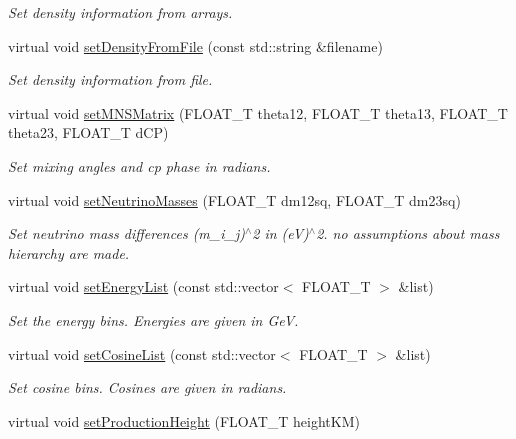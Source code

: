 \begin{DoxyCompactItemize}
\begin{DoxyCompactList}\small\item\em Set density information from arrays. \end{DoxyCompactList}\item 
virtual void \hyperlink{classcudaprob3_1_1Propagator_a7d40f7d7e0716e5b532a7a3a228d3b01}{set\+Density\+From\+File} (const std\+::string \&filename)
\begin{DoxyCompactList}\small\item\em Set density information from file. \end{DoxyCompactList}\item 
virtual void \hyperlink{classcudaprob3_1_1Propagator_ad866c252d72ae6cc0ed3fc3b76c7cac7}{set\+M\+N\+S\+Matrix} (F\+L\+O\+A\+T\+\_\+T theta12, F\+L\+O\+A\+T\+\_\+T theta13, F\+L\+O\+A\+T\+\_\+T theta23, F\+L\+O\+A\+T\+\_\+T d\+CP)
\begin{DoxyCompactList}\small\item\em Set mixing angles and cp phase in radians. \end{DoxyCompactList}\item 
virtual void \hyperlink{classcudaprob3_1_1Propagator_adaa3bc796f0bca8ce177f364c559b262}{set\+Neutrino\+Masses} (F\+L\+O\+A\+T\+\_\+T dm12sq, F\+L\+O\+A\+T\+\_\+T dm23sq)
\begin{DoxyCompactList}\small\item\em Set neutrino mass differences (m\+\_\+i\+\_\+j)$^\wedge$2 in (eV)$^\wedge$2. no assumptions about mass hierarchy are made. \end{DoxyCompactList}\item 
virtual void \hyperlink{classcudaprob3_1_1Propagator_a1135d977c5034e982a63c583ab4dad06}{set\+Energy\+List} (const std\+::vector$<$ F\+L\+O\+A\+T\+\_\+T $>$ \&list)
\begin{DoxyCompactList}\small\item\em Set the energy bins. Energies are given in GeV. \end{DoxyCompactList}\item 
virtual void \hyperlink{classcudaprob3_1_1Propagator_ac2beb7d48c566ef0f07666927fbf5e3f}{set\+Cosine\+List} (const std\+::vector$<$ F\+L\+O\+A\+T\+\_\+T $>$ \&list)
\begin{DoxyCompactList}\small\item\em Set cosine bins. Cosines are given in radians. \end{DoxyCompactList}\item 
virtual void \hyperlink{classcudaprob3_1_1Propagator_a5db866f0c9852d65cc2b1e43bbc3bef5}{set\+Production\+Height} (F\+L\+O\+A\+T\+\_\+T height\+KM)

\end{DoxyCompactItemize}
